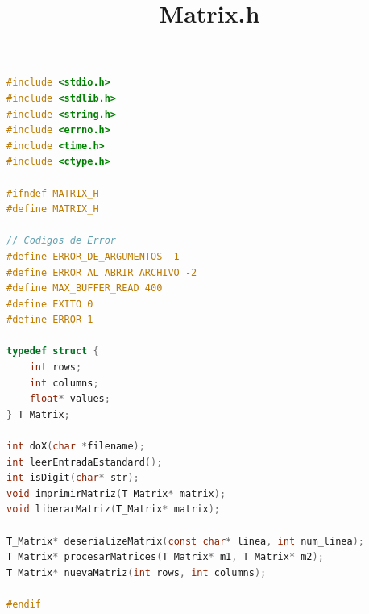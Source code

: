 \documentclass[a4paper,10pt]{article}
\begin{document}
\title{Matrix.h}
\begin{lstlisting}[language=C]
#include <stdio.h>
#include <stdlib.h>
#include <string.h>
#include <errno.h>
#include <time.h>
#include <ctype.h>

#ifndef MATRIX_H
#define MATRIX_H

// Codigos de Error
#define ERROR_DE_ARGUMENTOS -1
#define ERROR_AL_ABRIR_ARCHIVO -2
#define MAX_BUFFER_READ 400
#define EXITO 0
#define ERROR 1

typedef struct {
	int rows;
	int columns;
	float* values;
} T_Matrix;

int doX(char *filename);
int leerEntradaEstandard();
int isDigit(char* str);
void imprimirMatriz(T_Matrix* matrix);
void liberarMatriz(T_Matrix* matrix);

T_Matrix* deserializeMatrix(const char* linea, int num_linea);
T_Matrix* procesarMatrices(T_Matrix* m1, T_Matrix* m2);
T_Matrix* nuevaMatriz(int rows, int columns);

#endif

\end{lstlisting}
\end{document}

